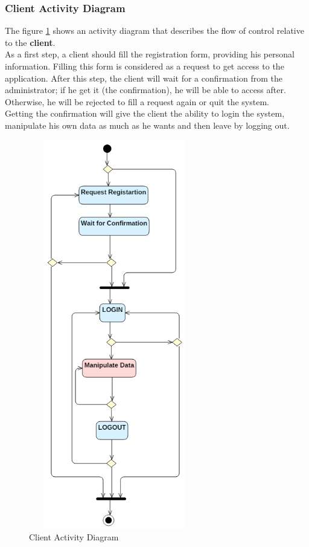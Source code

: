 \subsubsection{Client Activity Diagram}


The figure \ref{act2} shows an activity diagram that describes the flow of control relative to the \textbf{client}.\\

As a first step, a client should fill the registration form, providing his personal information. Filling this form is considered as a request to get access to the application. After this step, the client will wait for a confirmation from the administrator; if he get it (the confirmation), he will be able to access after. Otherwise, he will be rejected to fill a request again or quit the system.\\

Getting the confirmation will give the client the ability to login the system, manipulate his own data as much as he wants and then leave by logging out.  

\begin{figure}[H]
\begin{center}
\includegraphics[width=7.5cm,height=17cm]{chapter3/client.png}
\end{center}
\caption{Client Activity Diagram}
\label{act2}
\end{figure}


